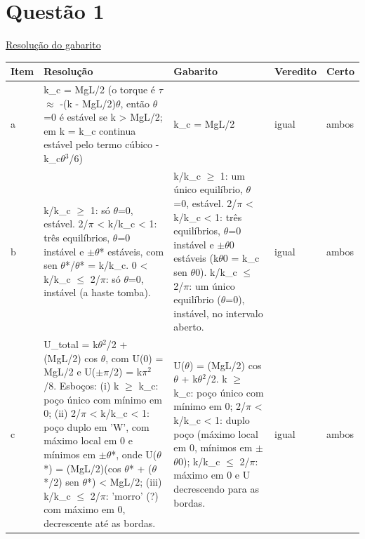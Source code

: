 \documentclass{article}%
\begin{document}
\section*{Questão 1}%
\href{https://poliedroresolve.sistemapoliedro.com.br/vestibulares/ita/2027/ita-2-fase-dia-3-22-10-2026-2-fase-dia-3/dissertativa-1-fisica-2-fase-dia-3-ita-2027}{Resolução do gabarito}\par\smallskip%
\begin{longtable}{@{}p{} p{} p{} p{} p{}@{}}\toprule Item & Resolução & Gabarito & Veredito & Certo \\ \midrule
a & k\_c = MgL/2 (o torque é $\tau$ $\approx$ -(k - MgL/2)$\theta$, então $\theta$=0 é estável se k > MgL/2; em k = k\_c continua estável pelo termo cúbico -k\_c$\theta$$^3$/6) & k\_c = MgL/2 & igual & ambos \\
b & k/k\_c $\geq$ 1: só $\theta$=0, estável. 2/$\pi$ < k/k\_c < 1: três equilíbrios, $\theta$=0 instável e $\pm$$\theta$* estáveis, com sen $\theta$*/$\theta$* = k/k\_c. 0 < k/k\_c $\leq$ 2/$\pi$: só $\theta$=0, instável (a haste tomba). & k/k\_c $\geq$ 1: um único equilíbrio, $\theta$=0, estável. 2/$\pi$ < k/k\_c < 1: três equilíbrios, $\theta$=0 instável e $\pm$$\theta$0 estáveis (k$\theta$0 = k\_c sen $\theta$0). k/k\_c $\leq$ 2/$\pi$: um único equilíbrio ($\theta$=0), instável, no intervalo aberto. & igual & ambos \\
c & U\_total = k$\theta$$^2$/2 + (MgL/2) cos $\theta$, com U(0) = MgL/2 e U($\pm$$\pi$/2) = k$\pi$$^2$/8. Esboços: (i) k $\geq$ k\_c: poço único com mínimo em 0; (ii) 2/$\pi$ < k/k\_c < 1: poço duplo em 'W', com máximo local em 0 e mínimos em $\pm$$\theta$*, onde U($\theta$*) = (MgL/2)(cos $\theta$* + ($\theta$*/2) sen $\theta$*) < MgL/2; (iii) k/k\_c $\leq$ 2/$\pi$: 'morro' (?) com máximo em 0, decrescente até as bordas. & U($\theta$) = (MgL/2) cos $\theta$ + k$\theta$$^2$/2. k $\geq$ k\_c: poço único com mínimo em 0; 2/$\pi$ < k/k\_c < 1: duplo poço (máximo local em 0, mínimos em $\pm$$\theta$0); k/k\_c $\leq$ 2/$\pi$: máximo em 0 e U decrescendo para as bordas. & igual & ambos \\
\bottomrule\end{longtable}%
\end{document}
